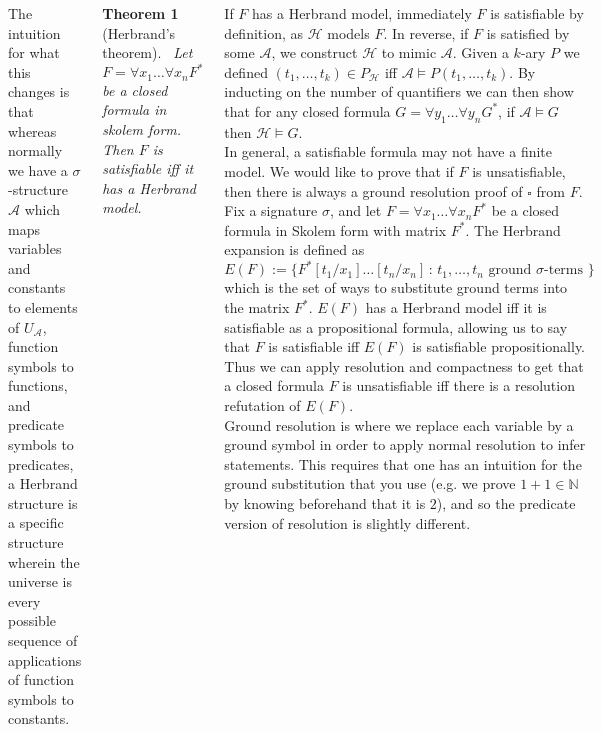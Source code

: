 \documentclass{tikzposter} %
\newtheorem{theorem}{Theorem}
\begin{document}
\begin{columns}
{      The intuition for what this changes is that whereas normally we have a $\sigma$-structure $\mathcal{A}$ which maps variables and constants to elements of $U_{\mathcal{A}}$, function symbols to functions, and predicate symbols to predicates, a Herbrand structure is a specific structure wherein the universe is every possible sequence of applications of function symbols to constants. \\

      \begin{theorem}[Herbrand's theorem]
      \ Let $F = \forall x_{1} \dots \forall x_{n} F^{*}$ be a closed formula in skolem form. Then $F$ is satisfiable iff it has a Herbrand model.
      \end{theorem}
      \hphantom{}

      If $F$ has a Herbrand model, immediately $F$ is satisfiable by definition, as $\mathcal{H}$ models $F$. In reverse, if $F$ is satisfied by some $\mathcal{A}$, we construct $\mathcal{H}$ to mimic $\mathcal{A}$. Given a $k$-ary $P$ we defined $(t_{1},\dots,t_{k}) \in P_{\mathcal{H}}$ iff $\mathcal{A} \vDash P(t_{1},\dots,t_{k})$. By inducting on the number of quantifiers we can then show that for any closed formula $G = \forall y_{1} \dots \forall y_{n} G^{*}$, if $\mathcal{A} \vDash G$ then $\mathcal{H} \vDash G$. \\

      In general, a satisfiable formula may not have a finite model. We would like to prove that if $F$ is unsatisfiable, then there is always a ground resolution proof of $\square$ from $F$. Fix a signature $\sigma$, and let $F = \forall x_{1} \dots \forall x_{n} F^{*}$ be a closed formula in Skolem form with matrix $F^{*}$. The Herbrand expansion is defined as
      \[
        E(F) := \{F^{*}[t_{1}/x_{1}]\dots [t_{n}/x_{n}] \,:\, t_{1},\dots,t_{n} \text{ ground $\sigma$-terms }\}
      \]
      which is the set of ways to substitute ground terms into the matrix $F^{*}$. $E(F)$ has a Herbrand model iff it is satisfiable as a propositional formula, allowing us to say that $F$ is satisfiable iff $E(F)$ is satisfiable propositionally. \\

      Thus we can apply resolution and compactness to get that a closed formula $F$ is unsatisfiable iff there is a resolution refutation of $E(F)$. \\

      Ground resolution is where we replace each variable by a ground symbol in order to apply normal resolution to infer statements. This requires that one has an intuition for the ground substitution that you use (e.g. we prove $1 + 1 \in \mathbb{N}$ by knowing beforehand that it is $2$), and so the predicate version of resolution is slightly different. \\

}
\end{columns}
\end{document}
